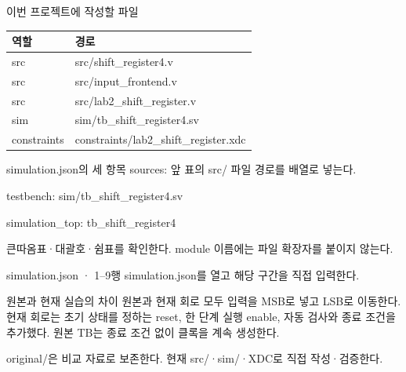 \begin{frame}{이번 프로젝트에 작성할 파일}
\small
\begin{center}\renewcommand{\arraystretch}{1.55}\begin{tabular}{ll}
역할 & 경로\\\hline
src & src/shift\_register4.v\\
src & src/input\_frontend.v\\
src & src/lab2\_shift\_register.v\\
sim & sim/tb\_shift\_register4.sv\\
constraints & constraints/lab2\_shift\_register.xdc\\
\end{tabular}\end{center}
\end{frame}

\begin{frame}{simulation.json의 세 항목}
\small
sources: 앞 표의 src/ 파일 경로를 배열로 넣는다.\par\vspace{0.26cm}testbench: sim/tb\_shift\_register4.sv\par\vspace{0.26cm}simulation\_top: tb\_shift\_register4\par\vspace{0.26cm}큰따옴표·대괄호·쉼표를 확인한다. module 이름에는 파일 확장자를 붙이지 않는다.\par
\end{frame}

\begin{frame}{simulation.json · 1–9행}
\small
simulation.json를 열고 해당 구간을 직접 입력한다.\par\vspace{0.4cm}\par\vspace{0.4cm}
\end{frame}

\begin{frame}{원본과 현재 실습의 차이}
\small
원본과 현재 회로 모두 입력을 MSB로 넣고 LSB로 이동한다. 현재 회로는 초기 상태를 정하는 reset, 한 단계 실행 enable, 자동 검사와 종료 조건을 추가했다. 원본 TB는 종료 조건 없이 클록을 계속 생성한다.\par\vspace{0.26cm}original/은 비교 자료로 보존한다. 현재 src/·sim/·XDC로 직접 작성·검증한다.\par
\end{frame}

